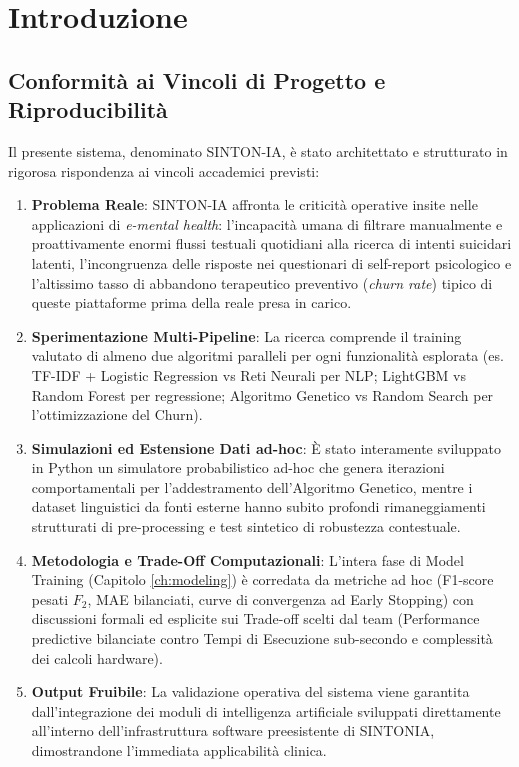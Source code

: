\chapter{Introduzione}
\label{ch:introduzione}

\section{Conformità ai Vincoli di Progetto e Riproducibilità}
\label{sec:vincoli_progetto}
Il presente sistema, denominato SINTON-IA, è stato architettato e strutturato in rigorosa rispondenza ai vincoli accademici previsti:
\begin{enumerate}
    \item \textbf{Problema Reale}: SINTON-IA affronta le criticità operative insite nelle applicazioni di \textit{e-mental health}: l'incapacità umana di filtrare manualmente e proattivamente enormi flussi testuali quotidiani alla ricerca di intenti suicidari latenti, l'incongruenza delle risposte nei questionari di self-report psicologico e l'altissimo tasso di abbandono terapeutico preventivo (\textit{churn rate}) tipico di queste piattaforme prima della reale presa in carico.
    \item \textbf{Sperimentazione Multi-Pipeline}: La ricerca comprende il training valutato di almeno due algoritmi paralleli per ogni funzionalità esplorata (es. TF-IDF + Logistic Regression vs Reti Neurali per NLP; LightGBM vs Random Forest per regressione; Algoritmo Genetico vs Random Search per l'ottimizzazione del Churn).
    \item \textbf{Simulazioni ed Estensione Dati ad-hoc}: È stato interamente sviluppato in Python un simulatore probabilistico ad-hoc che genera iterazioni comportamentali per l'addestramento dell'Algoritmo Genetico, mentre i dataset linguistici da fonti esterne hanno subito profondi rimaneggiamenti strutturati di pre-processing e test sintetico di robustezza contestuale.
    \item \textbf{Metodologia e Trade-Off Computazionali}: L'intera fase di Model Training (Capitolo \ref{ch:modeling}) è corredata da metriche ad hoc (F1-score pesati $F_2$, MAE bilanciati, curve di convergenza ad Early Stopping) con discussioni formali ed esplicite sui Trade-off scelti dal team (Performance predictive bilanciate contro Tempi di Esecuzione sub-secondo e complessità dei calcoli hardware).
    \item \textbf{Output Fruibile}: La validazione operativa del sistema viene garantita dall'integrazione dei moduli di intelligenza artificiale sviluppati direttamente all'interno dell'infrastruttura software preesistente di SINTONIA, dimostrandone l'immediata applicabilità clinica.
\end{enumerate}

